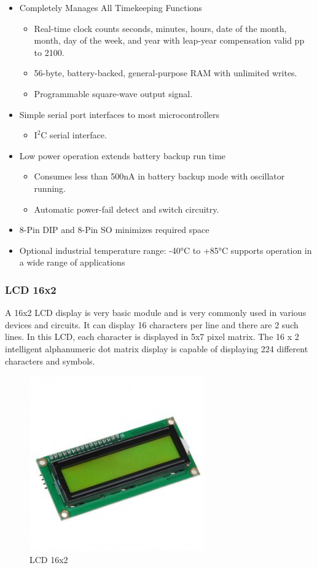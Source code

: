 \documentclass[a4paper]{article}
\begin{document}
 \begin{itemize}
   \item  Completely Manages All Timekeeping Functions
   \begin{itemize}
     \item  Real-time clock counts seconds, minutes, hours, date of the month, month, day of the week, and year with leap-year compensation valid pp to 2100.
     \item 56-byte, battery-backed, general-purpose RAM with unlimited writes.
     \item Programmable square-wave output signal.
   \end{itemize}
   \item Simple serial port interfaces to most microcontrollers
   \begin{itemize}
       \item $\mathrm{I^2C}$ serial interface.
   \end{itemize}
   \item Low power operation extends battery backup run time
   \begin{itemize}
       \item Consumes less than 500nA in battery backup mode with oscillator running.
       \item Automatic power-fail detect and switch circuitry.
   \end{itemize}
   \item 8-Pin DIP and 8-Pin SO minimizes required space
   \item Optional industrial temperature range: -40°C to +85°C supports operation in a wide range of applications
 \end{itemize}

\subsubsection{LCD 16x2}
A 16x2 LCD display is very basic module and is very commonly used in various devices and circuits. It can display 16 characters per line and there are 2 such lines. In this LCD, each character is displayed in 5x7 pixel matrix. The 16 x 2 intelligent alphanumeric dot matrix display is capable of displaying 224 different characters and symbols.
\begin{figure}[h!]
\centering
\includegraphics[width=7.55cm]{images/lcd.jpg}
\caption*{LCD 16x2}
\end{figure}
\end{document}
